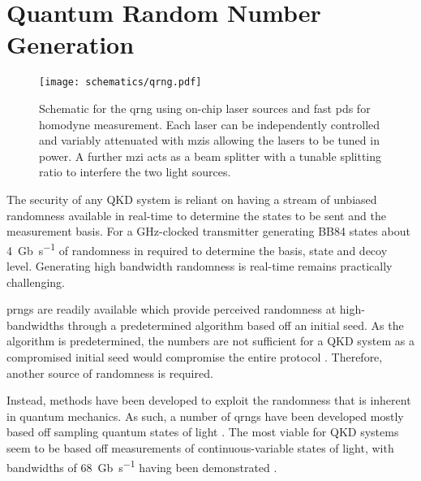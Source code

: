 

\section{Quantum Random Number Generation}
\label{sec:hhi_qrng}

\begin{figure}[tp]
	\centering
	\texttt{[image: schematics/qrng.pdf]}
	\caption[Schematic for InP quantum random number generator]{Schematic for the \acs{qrng} using on-chip laser sources and fast \acsp{pd} for homodyne measurement. Each laser can be independently controlled and variably attenuated with \acsp{mzi} allowing the lasers to be tuned in power. A further \acs{mzi} acts as a beam splitter with a tunable splitting ratio to interfere the two light sources.}
	\label{fig:qrng}
\end{figure}

The security of any \ac{QKD} system is reliant on having a stream of unbiased randomness available in real-time to determine the states to be sent and the measurement basis. For a \si{\GHz}-clocked transmitter generating BB84 states about \SI{4}{Gb\per\second} of randomness in required to determine the basis, state and decoy level. Generating high bandwidth randomness is real-time remains practically challenging.

\Acp{prng} are readily available which provide perceived randomness at high-bandwidths through a predetermined algorithm based off an initial seed. As the algorithm is predetermined, the numbers are not sufficient for a \ac{QKD} system as a compromised initial seed would compromise the entire protocol \cite{Bouda2012Weak, li2015randomness}. Therefore, another source of randomness is required.

Instead, methods have been developed to exploit the randomness that is inherent in quantum mechanics. As such, a number of \acp{qrng} have been developed mostly based off sampling quantum states of light \cite{Herrero-Collantes2017Quantum}. The most viable for \ac{QKD} systems seem to be based off measurements of continuous-variable states of light, with bandwidths of \SI{68}{Gb\per\second} having been demonstrated \cite{nie2015generation}.

